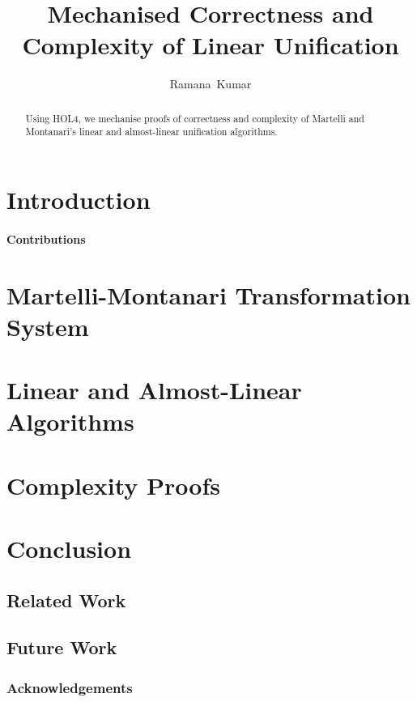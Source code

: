 \documentclass{llncs}
\begin{document}
\title{Mechanised Correctness and Complexity of Linear Unification}
\author{Ramana~Kumar}
\maketitle

\begin{abstract}
Using HOL4, we mechanise proofs of correctness and complexity of Martelli and Montanari's linear and almost-linear unification algorithms.
\end{abstract}

\section{Introduction}
\cite{MartelliM76}
\paragraph{Contributions}
\section{Martelli-Montanari Transformation System}
\section{Linear and Almost-Linear Algorithms}
\section{Complexity Proofs}
\section{Conclusion}
\subsection*{Related Work}
\subsection*{Future Work}
\subsubsection*{Acknowledgements}



\end{document}
